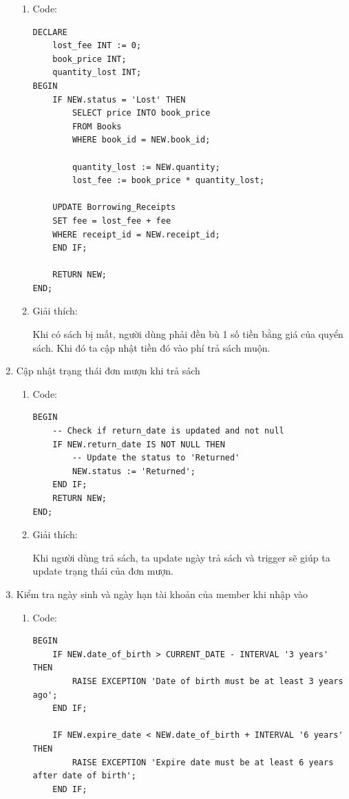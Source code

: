 \documentclass[12pt]{article}
\begin{document}
\begin{enumerate}
    \begin{enumerate}
        \item Code:
    
    \begin{lstlisting}
DECLARE
    lost_fee INT := 0;
    book_price INT;
    quantity_lost INT;
BEGIN
    IF NEW.status = 'Lost' THEN
        SELECT price INTO book_price
        FROM Books
        WHERE book_id = NEW.book_id;

        quantity_lost := NEW.quantity;
        lost_fee := book_price * quantity_lost;

    UPDATE Borrowing_Receipts
	SET fee = lost_fee + fee
	WHERE receipt_id = NEW.receipt_id;
    END IF;

    RETURN NEW;
END;
    \end{lstlisting}
    \item Giải thích:

    Khi có sách bị mất, người dùng phải đền bù 1 số tiền bằng giá của quyển sách. Khi đó ta cập nhật tiền đó vào phí trả sách muộn.
    \end{enumerate}
    \item Cập nhật trạng thái đơn mượn khi trả sách
    \begin{enumerate}
        \item Code:
        \begin{lstlisting}
BEGIN
    -- Check if return_date is updated and not null
    IF NEW.return_date IS NOT NULL THEN
        -- Update the status to 'Returned'
        NEW.status := 'Returned';
    END IF;
    RETURN NEW;
END;
        \end{lstlisting}
        \item Giải thích: 

        Khi người dùng trả sách, ta update ngày trả sách và trigger sẽ giúp ta update trạng thái của đơn mượn.
    \end{enumerate}
        \item Kiểm tra ngày sinh và ngày hạn tài khoản của member khi nhập vào
    \begin{enumerate}
        \item Code:
        \begin{lstlisting}
BEGIN
    IF NEW.date_of_birth > CURRENT_DATE - INTERVAL '3 years' THEN
        RAISE EXCEPTION 'Date of birth must be at least 3 years ago';
    END IF;

    IF NEW.expire_date < NEW.date_of_birth + INTERVAL '6 years' THEN
        RAISE EXCEPTION 'Expire date must be at least 6 years after date of birth';
    END IF;


\end{lstlisting}
\end{enumerate}
\end{enumerate}
\end{document}
